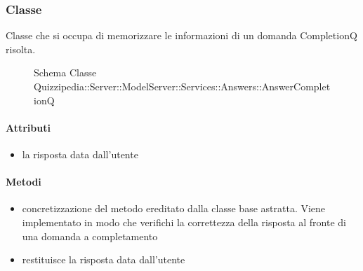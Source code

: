 \subsubsection{Classe }
Classe che si occupa di memorizzare le informazioni di un domanda CompletionQ risolta.
\begin{figure}[H]
\centering
\noindent{}
\caption[Schema Classe AnswerCompletionQ]{Schema Classe Quizzipedia::Server::ModelServer::Services::Answers::AnswerCompletionQ}
\end{figure}
\paragraph{Attributi}
\begin{itemize}
\item {}
\newline
la risposta data dall'utente
\end{itemize}
\paragraph{Metodi}
\begin{itemize}
\item {}
\newline
concretizzazione del metodo ereditato dalla classe base astratta. Viene implementato in modo che verifichi la correttezza della risposta al fronte di una domanda a completamento
\newline
\item {}
\newline
restituisce la risposta data dall'utente
\newline
\end{itemize}
